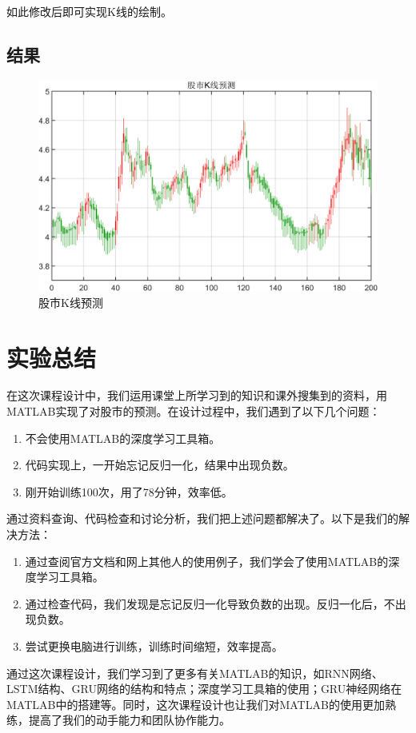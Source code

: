 \documentclass{jnuthesis}
\begin{document}
如此修改后即可实现K线的绘制。


\section{结果}
\begin{figure}[H]
	\centering
	\includegraphics[width=0.8\linewidth]{pic/screenshot029}
	\caption{股市K线预测}
	\label{fig:screenshot029}
\end{figure}








\chapter{实验总结}
在这次课程设计中，我们运用课堂上所学习到的知识和课外搜集到的资料，用MATLAB实现了对股市的预测。在设计过程中，我们遇到了以下几个问题：
\begin{enumerate}
	\item 不会使用MATLAB的深度学习工具箱。
\item 代码实现上，一开始忘记反归一化，结果中出现负数。
\item 刚开始训练100次，用了78分钟，效率低。
\end{enumerate}

通过资料查询、代码检查和讨论分析，我们把上述问题都解决了。以下是我们的解决方法：
\begin{enumerate}
	\item 通过查阅官方文档和网上其他人的使用例子，我们学会了使用MATLAB的深度学习工具箱。
\item 通过检查代码，我们发现是忘记反归一化导致负数的出现。反归一化后，不出现负数。
\item 尝试更换电脑进行训练，训练时间缩短，效率提高。
\end{enumerate}

通过这次课程设计，我们学习到了更多有关MATLAB的知识，如RNN网络、LSTM结构、GRU网络的结构和特点；深度学习工具箱的使用；GRU神经网络在MATLAB中的搭建等。同时，这次课程设计也让我们对MATLAB的使用更加熟练，提高了我们的动手能力和团队协作能力。

%
%
%
%
%


\end{document}

